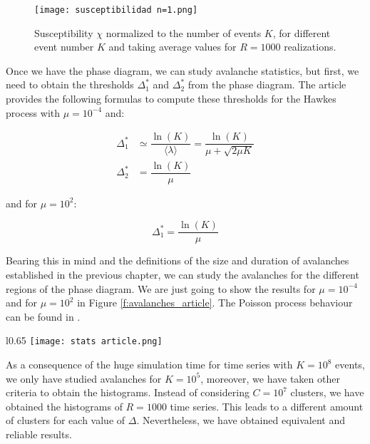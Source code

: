 \begin{figure}[H]
    \centering
    \texttt{[image: susceptibilidad n=1.png]}
    \caption{Susceptibility $\chi$ normalized to the number of events $K$, for different event number $K$ and taking average values for $R=1000$ realizations.}
    \label{f:susceptibilidad_article}   
\end{figure}

Once we have the phase diagram, we can study avalanche statistics, but first, we need to obtain the thresholds $\Delta_1^*$ and $\Delta_2^*$ from the phase diagram. 
The article \cite{notarmuzi2021percolation} provides the following formulas to compute these thresholds for the Hawkes process with $\mu=10^{-4}$ and:

\begin{align}
    \Delta_1^* &\simeq \dfrac{\ln(K)}{\langle \lambda \rangle}= \dfrac{\ln(K)}{\mu+\sqrt{2\mu K}} \label{eq:Ecuación delta1 *} \\
    \Delta_2^* &= \dfrac{\ln(K)}{\mu}\label{eq:Ecuación delta2 *}
\end{align}

and for $\mu=10^2$:

\begin{equation}
    \Delta_1^* = \dfrac{\ln(K)}{\mu}
\end{equation}

Bearing this in mind and the definitions of the size and duration of avalanches established in the previous chapter, we can study the avalanches for the different regions
of the phase diagram. We are just going to show the results for $\mu=10^{-4}$ and for $\mu=10^2$ in Figure \ref{f:avalanches_article}. The Poisson process behaviour can be found in 
\cite{stauffer2018introduction, stauffer1978critical}. 


\begin{wrapfigure}{l}{0.65\textwidth}
      \texttt{[image: stats article.png]}
    \caption{Avalanche analysis for Hawkes process with $n=1$, $K=10^5$ events. The histograms have been calculated over $R=1000$ time series.}
    \label{f:avalanches_article}
\end{wrapfigure}

As a consequence of the huge simulation time for time series with $K=10^8$ events, we only have studied avalanches for $K=10^5$, moreover, we have taken other criteria to obtain the 
histograms. Instead of considering $C=10^7$ clusters, we have obtained the histograms of $R=1000$ time series. This leads to a different amount of clusters for each value of $\Delta$.
Nevertheless, we have obtained equivalent and reliable results.

